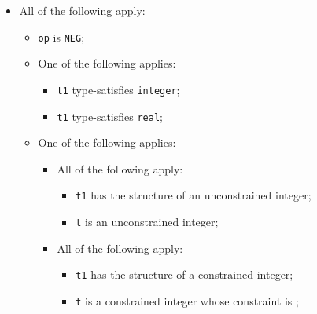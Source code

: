 \documentclass{book}
\begin{document}
\begin{itemize}
  \item All of the following apply:
    \begin{itemize}
    \item \texttt{op} is \texttt{NEG};
    \item One of the following applies:
      \begin{itemize}
      \item \texttt{t1} type-satisfies \texttt{integer};
      \item \texttt{t1} type-satisfies \texttt{real};
      \end{itemize}
     \item One of the following applies:
       \begin{itemize}
       \item All of the following apply:
         \begin{itemize}
         \item \texttt{t1} has the structure of an unconstrained integer;
         \item \texttt{t} is an unconstrained integer;
         \end{itemize}
       \item All of the following apply:
         \begin{itemize}
         \item \texttt{t1} has the structure of a constrained integer;
         \item \texttt{t} is a constrained integer whose constraint is ;
         \end{itemize}
       \end{itemize}
    \end{itemize}


\end{itemize}
\end{document}
